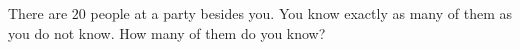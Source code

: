 There are $20$ people at a party besides you. You know exactly as many of them as you do not know. How many of them do you know?
